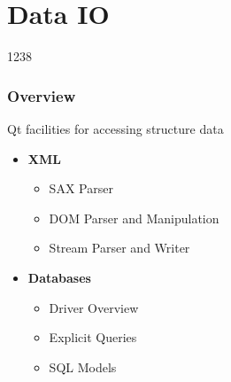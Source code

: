 %
%
%
%

\section{Data IO}

\begin{slide}{1238}\label{xml-processing}
\frametitle{Overview}

Qt facilities for accessing structure data

\begin{itemize}
\item \textbf{XML}
  \begin{itemize}
  \item SAX Parser
  \item DOM Parser and Manipulation
  \item Stream Parser and Writer
  \end{itemize}
\item \textbf{Databases}
  \begin{itemize}
  \item Driver Overview
  \item Explicit Queries
  \item SQL Models
  \end{itemize}
\end{itemize}
\end{slide}




